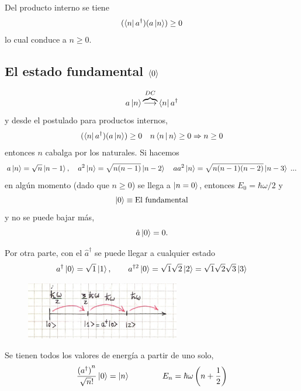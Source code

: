 \documentclass[10pt,oneside]{CBFT_book}
\begin{document}
Del producto interno se tiene
\[
	(\Bra{n}a^\dagger)(a\Ket{n}) \geq 0
\]
lo cual conduce a $ n \geq 0 $.

\subsection{El estado fundamental $\Braket{0}$}

\[
	a \Ket{n}  \overbrace{\longrightarrow}^{DC} \Bra{n} a^\dagger
\]
y desde el postulado para productos internos,
\[
	(\Bra{n}a^\dagger)(a\Ket{n}) \geq 0 \quad n \Braket{n|n} \geq 0 \Rightarrow n \geq 0 
\]
entonces $n$ cabalga por los naturales.
Si hacemos 
\[
	a\Ket{n} = \sqrt{n} \Ket{n-1}, \quad  
	a^2 \Ket{n} = \sqrt{n (n-1)} \Ket{n-2} \quad 
	a a^2 \Ket{n} = \sqrt{n (n-1)(n-2)} \Ket{n-3} \; ...
\]
en algún momento (dado que $n\geq 0$) se llega a $\Ket{n=0}$, entonces $E_0 = \hbar\omega/2$ y 
\[
	\Ket{0} \equiv \text{El fundamental}
\]
y no se puede bajar más,
\[
	\hat{a}\Ket{0} = 0.
\]

Por otra parte, con el $\hat{a}^\dagger$ se puede llegar a cualquier estado
\[
	a^\dagger \Ket{0} = \sqrt{1} \Ket{1}, \qquad  a^{\dagger 2} \Ket{0} = \sqrt{1}\sqrt{2} \Ket{2} = 
	\sqrt{1}\sqrt{2}\sqrt{3} \Ket{3}
\]

\begin{figure}[htb]
	\begin{center}
	\includegraphics[width=0.6\textwidth]{images/fig_ft2_osc_arm1.jpg}	 
	\end{center}
	\caption{}
\end{figure} 

Se tienen todos los valores de energía a partir de uno solo,
\[
	\frac{{(a^{\dagger})}^n}{\sqrt{n}!} \Ket{0} = \Ket{n} \qquad \qquad 
	E_n = \hbar \omega \left( n + \frac{1}{2} \right)
\]
\end{document}
